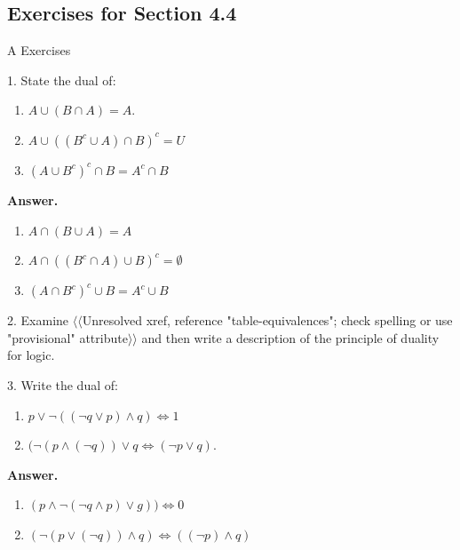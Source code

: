 \documentclass[10pt,]{book}
\theoremstyle{plain}
\theoremstyle{definition}
\theoremstyle{definition}
\theoremstyle{definition}
\begin{document}
\subsection[Exercises for Section 4.4 ]{Exercises for Section 4.4 }\label{exer-4-4}
\hypertarget{exercisegroup-8}{}\typeout{************************************************}
\typeout{************************************************}
A Exercises%
\begin{exercisegroup}
\item[1.]\hypertarget{exercise-20}{} State the dual of:%
\par
\leavevmode%
\begin{enumerate}[label=\alph*]
\item\hypertarget{li-68}{}\(A \cup  (B \cap  A) = A\).%
\item\hypertarget{li-69}{}\(A \cup  \left(\left(B^c \cup  A\right) \cap B\right)^c = U\)%
\item\hypertarget{li-70}{}\(\left(A \cup  B^c\right)^c \cap  B =A^c\cap B\)%
\end{enumerate}
%
\par\smallskip
\par\smallskip
\noindent\textbf{Answer.}\hypertarget{answer-10}{}\quad
\leavevmode%
\begin{enumerate}[label=\alph*]
\item\hypertarget{li-71}{} \(A\cap (B\cup A)=A\)%
\item\hypertarget{li-72}{} \(A \cap \left(\left(B^c\cap A\right)\cup B\right)^c=\emptyset\)%
\item\hypertarget{li-73}{} \(\left(A\cap B^c\right)^c\cup B=A^c\cup B\)%
\end{enumerate}
%
\item[2.]\hypertarget{exercise-21}{} Examine {$\langle\langle$Unresolved xref, reference "table-equivalences"; check spelling or use "provisional" attribute$\rangle\rangle$} and then write a description of the principle of duality for logic.%
\par\smallskip
\item[3.]\hypertarget{exercise-22}{}  Write the dual of:%
\par
\leavevmode%
\begin{enumerate}[label=\alph*]
\item\hypertarget{li-74}{}\(p\lor \neg ((\neg q\lor p)\land q)\Leftrightarrow 1\)%
\item\hypertarget{li-75}{}\((\neg (p \land  (\neg  q )) \lor  q\Leftrightarrow (\neg p \lor  q)\).%
\end{enumerate}
%
\par\smallskip
\par\smallskip
\noindent\textbf{Answer.}\hypertarget{answer-11}{}\quad
\leavevmode%
\begin{enumerate}[label=\alph*]
\item\hypertarget{li-76}{} \((p \land \neg (\neg  q \land p)\lor g)) \Leftrightarrow 0\)%
\item\hypertarget{li-77}{} \((\neg (p \lor  (\neg q)) \land q)\Leftrightarrow ((\neg p) \land q)\)%
\end{enumerate}
%
\end{exercisegroup}
\end{document}
